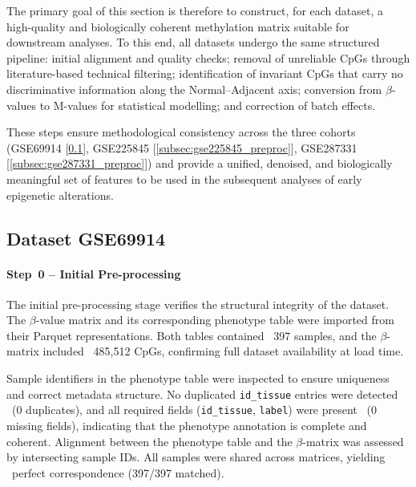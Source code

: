 \documentclass[10pt]{extarticle}
\newcommand{\good}[1]{\textcolor{teal!70!black}{\ding{51}~#1}}
\begin{document}
The primary goal of this section is therefore to construct, for each dataset, a high-quality and biologically coherent
methylation matrix suitable for downstream analyses. To this end, all datasets undergo the same structured pipeline:
initial alignment and quality checks; removal of unreliable CpGs through literature-based technical filtering; identification of invariant CpGs that
carry no discriminative information along the Normal–Adjacent axis; conversion
from $\beta$-values to M-values for statistical modelling; and correction of batch effects.

These steps ensure methodological consistency across the three cohorts (GSE69914 [\ref{subsec:gse69914_preproc}], GSE225845 [\ref{subsec:gse225845_preproc}], GSE287331 [\ref{subsec:gse287331_preproc}]) and
provide a unified, denoised, and biologically meaningful set of features to be used in the subsequent analyses of early
epigenetic alterations.


\subsection{Dataset GSE69914}
\label{subsec:gse69914_preproc}


\paragraph{Step~0 -- Initial Pre-processing}
\label{par:gse69914_step0}

The initial pre-processing stage verifies the structural integrity of the dataset.
The $\beta$-value matrix and its corresponding phenotype table were imported from
their Parquet representations. Both tables contained \good{397 samples}, and the $\beta$-matrix included
\good{485{,}512 CpGs}, confirming full dataset availability at load time.

Sample identifiers in the phenotype table were inspected to ensure uniqueness and correct metadata structure. No
duplicated \texttt{id\_tissue} entries were detected \good{(0 duplicates)}, and all required fields (\texttt{id\_tissue}, \texttt{label})
were present \good{(0 missing fields)}, indicating that the phenotype annotation is complete and coherent. Alignment
between the phenotype table and the $\beta$-matrix was assessed by intersecting sample IDs. All samples were shared
across matrices, yielding \good{perfect correspondence (397/397 matched)}.
\end{document}
